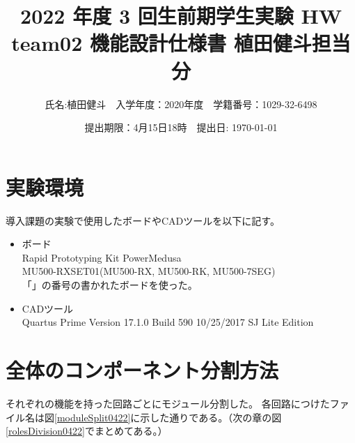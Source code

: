 \documentclass[a4j,titlepage]{jarticle}
\begin{document}
\title{2022 年度 3 回生前期学生実験 HW  \\ \bf team02 機能設計仕様書 植田健斗担当分}
\author{氏名:植田健斗　入学年度：2020年度　学籍番号：1029-32-6498}
\date{提出期限：4月15日18時　提出日: \today} %
\maketitle
\newpage

\section{実験環境}
導入課題の実験で使用したボードやCADツールを以下に記す。

\begin{itemize}
\item ボード \\Rapid Prototyping Kit PowerMedusa \\ MU500-RXSET01(MU500-RX, MU500-RK, MU500-7SEG) \\「」の番号の書かれたボードを使った。  
\item CADツール \\ Quartus Prime Version 17.1.0 Build 590 10/25/2017 SJ Lite Edition
\end{itemize}

\section{全体のコンポーネント分割方法}

それぞれの機能を持った回路ごとにモジュール分割した。
各回路につけたファイル名は図\ref{moduleSplit0422}に示した通りである。（次の章の図\ref{rolesDivision0422}でまとめてある。）
\end{document}
